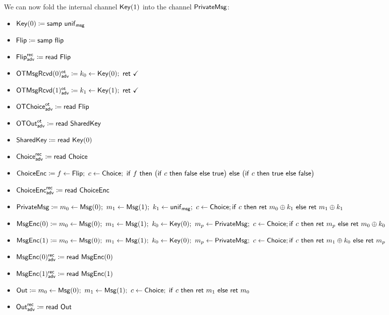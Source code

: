 \noindent We can now fold the internal channel $\mathsf{Key}(1)$ into the channel $\mathsf{PrivateMsg}$:

\begin{itemize}
\item $\mathsf{Key}(0) \coloneqq \mathsf{samp} \ \mathsf{unif}_{\mathsf{msg}}$
\item $\mathsf{Flip} \coloneqq \mathsf{samp} \ \mathsf{flip}$
\item {\color{blue} $\mathsf{Flip}^{\mathsf{rec}}_{\mathsf{adv}} \coloneqq \mathsf{read} \ \mathsf{Flip}$}
\item {\color{blue} $\LeakOTMsgRcvd(0)^\ot_\adv \coloneqq k_0 \leftarrow \Key(0); \ \ret{\checkmark}$}
\item {\color{blue} $\LeakOTMsgRcvd(1)^\ot_\adv \coloneqq k_1 \leftarrow \Key(1); \ \ret{\checkmark}$}
\item {\color{blue} $\mathsf{OTChoice}^{\mathsf{ot}}_{\mathsf{adv}} \coloneqq \mathsf{read} \ \mathsf{Flip}$}
\item {\color{blue} $\mathsf{OTOut}^{\mathsf{ot}}_{\mathsf{adv}} \coloneqq \mathsf{read} \ \mathsf{SharedKey}$}
\item $\mathsf{SharedKey} \coloneqq \mathsf{read} \ \mathsf{Key}(0)$
\item {\color{blue} $\mathsf{Choice}^{\mathsf{rec}}_{\mathsf{adv}} \coloneqq \mathsf{read} \ \mathsf{Choice}$}
\item $\ChoiceEnc \coloneqq f \leftarrow \Flip; \ c \leftarrow \Choice; \ \ifte{f}{\big(\ifte{c}{\false}{\true}\big)}{\big(\ifte{c}{\true}{\false}\big)}$
\item {\color{blue} $\mathsf{ChoiceEnc}^{\mathsf{rec}}_{\mathsf{adv}} \coloneqq \mathsf{read} \ \mathsf{ChoiceEnc}$}
\item {\color{red} $\mathsf{PrivateMsg} \coloneqq m_0 \leftarrow \mathsf{Msg}(0); \ m_1 \leftarrow \mathsf{Msg}(1); \ k_1 \leftarrow \mathsf{unif}_{\mathsf{msg}}; \ c \leftarrow \mathsf{Choice}; \\ \mathsf{if} \ c \ \mathsf{then} \ \mathsf{ret} \ m_0 \oplus k_1 \ \mathsf{else} \ \mathsf{ret} \ m_1 \oplus k_1$}
\item $\mathsf{MsgEnc}(0) \coloneqq m_0 \leftarrow \mathsf{Msg}(0); \ m_1 \leftarrow \mathsf{Msg}(1); \ k_0 \leftarrow \mathsf{Key}(0); \ m_p \leftarrow \mathsf{PrivateMsg}; \ c \leftarrow \mathsf{Choice}; \\ \mathsf{if} \ c \ \mathsf{then} \ \mathsf{ret} \ m_p \ \mathsf{else} \ \mathsf{ret} \ m_0 \oplus k_0$
\item $\mathsf{MsgEnc}(1) \coloneqq m_0 \leftarrow \mathsf{Msg}(0); \ m_1 \leftarrow \mathsf{Msg}(1); \ k_0 \leftarrow \mathsf{Key}(0); \ m_p \leftarrow \mathsf{PrivateMsg}; \ c \leftarrow \mathsf{Choice}; \\ \mathsf{if} \ c \ \mathsf{then} \ \mathsf{ret} \ m_1 \oplus k_0 \ \mathsf{else} \ \mathsf{ret} \ m_p$
\item {\color{blue} $\mathsf{MsgEnc}(0)^{\mathsf{rec}}_{\mathsf{adv}} \coloneqq \mathsf{read} \ \mathsf{MsgEnc}(0)$}
\item {\color{blue} $\mathsf{MsgEnc}(1)^{\mathsf{rec}}_{\mathsf{adv}} \coloneqq \mathsf{read} \ \mathsf{MsgEnc}(1)$}
\item $\Out \coloneqq m_0 \leftarrow \Msg(0); \ m_1 \leftarrow \Msg(1); \ c \leftarrow \Choice; \ \ifte{c}{\ret{m_1}}{\ret{m_0}}$
\item {\color{blue} $\mathsf{Out}^{\mathsf{rec}}_{\mathsf{adv}} \coloneqq \mathsf{read} \ \mathsf{Out}$}
\end{itemize}

